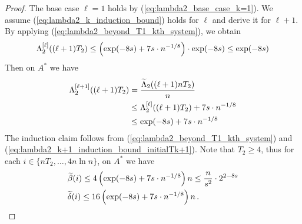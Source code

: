 \documentclass[a4paper,12pt]{article}
\begin{document}
\begin{proof}
The base case $\ell =1$ holds by (\ref{eq:lambda2_base_case_k=1}). We assume (\ref{eq:lambda2_k_induction_bound}) holds for $\ell $ and derive it for $\ell +1$. By applying (\ref{eq:lambda2_beyond_T1_kth_system}), we obtain
\begin{align}  \label{eq:lambda2_k+1_induction_bound_initialTk}
\Lambda_2^{[\ell ]}((\ell +1) T_2) \leq \Bigl(\exp(-8s) + 7s \cdot n^{-1/8} \Bigr) \cdot \exp(-8s) \leq \exp(-8s)
\end{align}
Then on $A^*$ we have
\begin{align}\label{eq:lambda2_k+1_induction_bound_initialTk+1}  \Lambda_2^{[\ell +1]}((\ell +1)T_2) & = \frac{\widetilde{\Lambda}_2((\ell +1)nT_2)}{n} \notag \\
& \leq \Lambda_2^{[\ell ]}((\ell +1) T_2) + 7s \cdot n^{-1/8} \notag \\
& \leq \exp(-8s) + 7s \cdot n^{-1/8}
\end{align}
The induction claim follows from (\ref{eq:lambda2_beyond_T1_kth_system}) and (\ref{eq:lambda2_k+1_induction_bound_initialTk+1}). Note that $T_2 \geq 4$, thus for each $i \in \{nT_2, \ldots, 4n\ln{n}\}$, on $A^*$ we have
\begin{align} \label{eq:beta_delta_tilde_i_ub}
 & \widetilde{\beta}(i) \leq 4\left(\exp(-8s) + 7s \cdot n^{-1/8}\right) n \leq \frac{n}{s^2} \cdot 2^{2-8s}  \notag \\
& \widetilde{\delta}(i) \leq 16\left(\exp(-8s) + 7s \cdot n^{-1/8}\right) n\,.
\end{align}


\end{proof}
\end{document}
